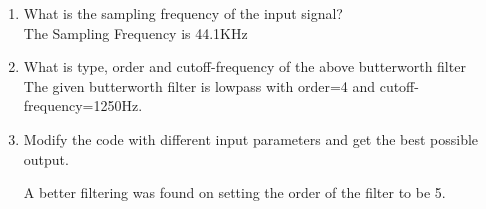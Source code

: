 \documentclass[journal,12pt,twocolumn]{IEEEtran}
\theoremstyle{remark}
\begin{document}
\begin{enumerate}[label=\thesection.\arabic*]
			\item What is the sampling frequency of the input signal?\\
				\solution The Sampling Frequency is 44.1KHz
			\item
				What is type, order and  cutoff-frequency of the above butterworth filter
				\\
				\solution The given butterworth filter is lowpass with order=4 and cutoff-frequency=1250Hz.

			\item
				Modify the code with different input parameters and get the best possible output.

				\solution
				A better filtering was found on setting the order of the filter to be 5.
		\end{enumerate}

	
\end{document}
